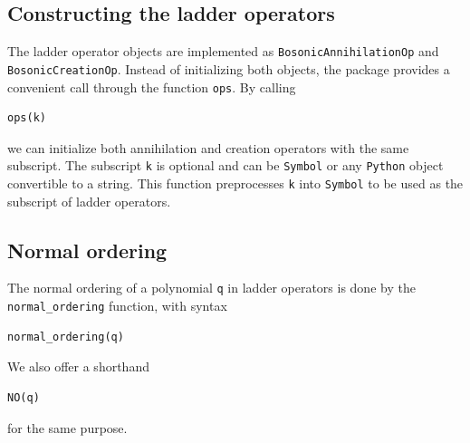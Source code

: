 \documentclass[onecolumn, 12pt, sort&compress]{elsarticle}
\newcommand{\inlinecode}[1]{\texttt{#1}}
\newenvironment{revision}{%
\color{red}
}
{}
\begin{document}

\subsection{Constructing the ladder operators}

\begin{revision}The ladder operator objects are implemented as \inlinecode{BosonicAnnihilationOp} and \inlinecode{BosonicCreationOp}. Instead of initializing both objects, the package provides a convenient call through the function \inlinecode{ops}.\end{revision} By calling
\begin{verbatim}
ops(k)
\end{verbatim}
we can initialize both annihilation and creation operators with the same subscript. The subscript \inlinecode{k} is optional and can be \inlinecode{Symbol} or any \texttt{Python} object convertible to a string. This function preprocesses \inlinecode{k} into \inlinecode{Symbol} to be used as the subscript of ladder operators. 

\subsection{Normal ordering}
\label{subsec_normal_ordering}

The normal ordering of a polynomial \inlinecode{q} in ladder operators is done by the \inlinecode{normal_ordering} function, with syntax
\begin{verbatim}
normal_ordering(q)
\end{verbatim}
We also offer a shorthand
\begin{verbatim}
NO(q)
\end{verbatim}
for the same purpose.  
\end{document}
